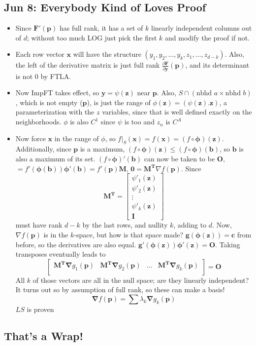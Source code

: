 \documentclass[10pt, oneside]{article}
\newcommand{\del}{\partial}
\let\leq\leqslant
\renewcommand{\vec}[1]{\mathbf{#1}}
\newcommand{\vecf}[1]{\boldsymbol{#1}}
\newcommand{\mat}[1]{\mathbf{#1}}
\begin{document}
\subsection{Jun 8: Everybody Kind of Loves Proof}
\begin{itemize}
    \item Since $\vecf{F'}(\vec{p})$ has full rank, it has a set of $k$ linearly independent columns out of $d$; without too much LOG just pick the first $k$ and modify the proof if not.
    \item Each row vector $\vec{x}$ will have the structure $(y_1,y_2, \hdots, y_k, z_1, \hdots, z_{d-k})$. Also, the left of the derivative matrix is just full rank $\frac{\del \vecf{F}}{\del \vec{y}}(\vec{p})$, and its determinant is not $0$ by FTLA.
    \item Now ImpFT takes effect, so $\vec{y} = \psi(\vec{z})$ near $\vec{p}$. Also, $S \cap (\text{nbhd } a \times \text{nbhd } b)$, which is not empty ($\vec{p}$), is just the range of $\phi(\vec{z}) = (\psi(\vec{z}).\vec{z})$, a parameterization with the $z$ variables, since that is well defined exactly on the neighborhoods. $\phi$ is also $C^1$ since $\psi$ is too and $z_n$ is $C^A$
    \item Now force $\vec{x}$ in the range of $\phi$, so $f|_S(\vec{x}) = f(\vec{x}) = (f \circ \vecf{\phi})(\vec{z})$. Additionally, since $\vec{p}$ is a maximum, $(f \circ \vecf{\phi})(\vec{z}) \leq (f \circ \vecf{\phi})(\vec{b})$, so $\vec{b}$ is also a maximum of its set. $(f \circ \vecf{\phi})'(\vec{b})$ can now be taken to be $\mat{O}$, $= f'(\vecf{\phi}(\vec{b})) \vecf{\phi '}(\vec{b}) = f'(\vec{p}) \mat{M}$, $\vec{0} = \mat{M^T} \nabla f (\vec{p})$. Since 
            \[\mat{M^T} = \begin{bmatrix}
                \psi'_1 (\vec{z})\\
                \psi'_2 (\vec{z})\\
                \vdots\\
                \psi'_k (\vec{z})\\
                \mat{I}
            \end{bmatrix}\]
        must have rank $d-k$ by the last rows, and nullity $k$, adding to $d$. Now, $\nabla f(\vec{p})$ is in the $k$-space, but how is that space made? $\vecf{g}(\vecf{\phi}(\vec{z})) = \vec{c}$ from before, so the derivatives are also equal. $\vecf{g'}(\vecf{\phi}(\vec{z})) \vecf{\phi '}(\vec{z}) = \mat{O}$. Taking transposes eventually leads to 
            \[\begin{bmatrix}
                \mat{M^T}\vec{\nabla} g_1(\vec{p}) & \mat{M^T}\vec{\nabla} g_2(\vec{p}) & \hdots & \mat{M^T}\vec{\nabla} g_k(\vec{p})\\
            \end{bmatrix} = \mat{O}\]
        All $k$ of those vectors are all in the null space; are they linearly independent? It turns out so by assumption of full rank, so these can make a basis!
            \[\vec{\nabla} f(\vec{p}) = \sum \lambda_k \vec{\nabla} g_k (\vec{p})\]
        $LS$ is proven
\end{itemize}

\subsection{That's a Wrap!}
\end{document}
